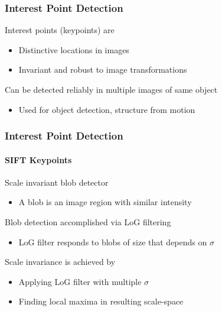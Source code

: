 \documentclass[xetex,professionalfont]{beamer}
\renewcommand\emph[1]{\textcolor{tuwcvl_inf_red}{#1}}
\begin{document}

\begin{frame}
\frametitle{Interest Point Detection}

\emph{Interest points} (\emph{keypoints}) are
\begin{itemize}
    \item Distinctive locations in images
    \item Invariant and robust to image transformations %
\end{itemize}

\bigskip
Can be detected reliably in multiple images of same object
\begin{itemize}
    \item Used for object detection, structure from motion
\end{itemize}

\end{frame}


\begin{frame}
\frametitle{Interest Point Detection}
\framesubtitle{SIFT Keypoints}

Scale invariant blob detector
\begin{itemize}
    \item A \emph{blob} is an image region with similar intensity %
\end{itemize}

\bigskip
Blob detection accomplished via LoG filtering
\begin{itemize}
    \item LoG filter responds to blobs of size that depends on $\sigma$
\end{itemize}

\bigskip
Scale invariance is achieved by
\begin{itemize}
    \item Applying LoG filter with multiple $\sigma$
    \item Finding local maxima in resulting scale-space
\end{itemize}


\end{frame}
\end{document}
